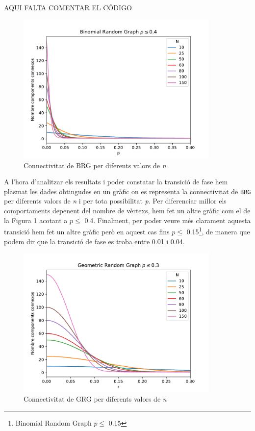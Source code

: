 AQUI FALTA COMENTAR EL CÓDIGO

\begin{figure}[H]
    \centering
    \includegraphics[width=10cm]{plots/bin_mult_2_04.pdf}
    \caption{Connectivitat de BRG per diferents valors de \textit{n}}
    \label{fig:connect_04}
\end{figure}

A l'hora d'analitzar els resultats i poder constatar la transició de fase hem plasmat les dades obtingudes en un gràfic on es representa la connectivitat de \texttt{BRG} per diferents valors de \textit{n} i per tota possibilitat \textit{p}. Per diferenciar millor els comportaments depenent del nombre de vèrtexs, hem fet un altre gràfic com el de la Figura 1 acotant a $p\leq$ 0.4. Finalment, per poder veure més clarament aquesta transició hem fet un altre gràfic però en aquest cas fins $p\leq$ 0.15\footnote{Binomial Random Graph $p\leq$ 0.15}, de manera que podem dir que la transició de fase es troba entre 0.01 i 0.04.


\begin{figure}[H]
    \centering
    \includegraphics[width=10cm]{plots/geo_mult_2_03.pdf}
    \caption{Connectivitat de GRG per diferents valors de \textit{n}}
    \label{fig:connect_04}
\end{figure}


